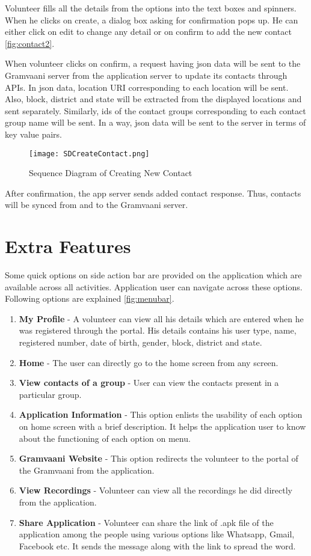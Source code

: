 \begin{itemize}
Volunteer fills all the details from the options into the text boxes and spinners. When he clicks on create, a dialog box asking for confirmation pops up. He can either click on edit to change any detail or on confirm to add the new contact \ref{fig:contact2}.

When volunteer clicks on confirm, a request having json data will be sent to the  Gramvaani server from the application server to update its contacts through APIs. In json data, location URI corresponding to each location will be sent. Also, block, district and state will be extracted from the displayed locations and sent separately. Similarly, ids of the contact groups corresponding to each contact group name will be sent. In a way, json data will be sent to the server in terms of key value pairs.

\begin{figure}[H]
    \centering
	\texttt{[image: SDCreateContact.png]}
    \caption{ Sequence Diagram of Creating New Contact}
    \label{fig:Sequence Diagram of Creating New Contact}
\end{figure}

 After confirmation, the app server sends added contact response. Thus, contacts will be synced from and to the Gramvaani server.

\section{Extra Features}

Some quick options on side action bar are provided on the application which are available across all activities. Application  user can navigate across these options. Following options are explained \ref{fig:menubar}.
\begin{enumerate}
\item \textbf {My Profile} - A volunteer can view all his details which are entered when he was registered through the portal. His details contains his user type, name, registered number, date of birth, gender, block, district and state.
\item \textbf{Home} - The user can directly go to the home screen from any screen.
\item \textbf{View contacts of a group} - User can view the contacts present in a particular group.
\item \textbf{Application Information} - This option enlists the usability of each option on home screen with a brief description. It helps the application user to know about the functioning of each option on menu.
\item \textbf{Gramvaani Website} - This option redirects the volunteer to the portal of the Gramvaani from the application.
\item \textbf{View Recordings} - Volunteer can view all the recordings he did directly from the application.
\item \textbf{Share Application} - Volunteer can share the link of .apk file of the application among the people using various options like Whatsapp, Gmail, Facebook etc. It sends the message along with the link to spread the word.
\end{enumerate}



\end{itemize}
